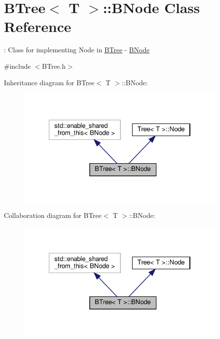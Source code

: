 \hypertarget{classBTree_1_1BNode}{}\section{B\+Tree$<$ T $>$\+:\+:B\+Node Class Reference}
\label{classBTree_1_1BNode}


\+: Class for implementing Node in \hyperlink{classBTree}{B\+Tree} -\/ \hyperlink{classBTree_1_1BNode}{B\+Node}  




{\ttfamily \#include $<$B\+Tree.\+h$>$}



Inheritance diagram for B\+Tree$<$ T $>$\+:\+:B\+Node\+:
\nopagebreak
\begin{figure}[H]
\begin{center}
\leavevmode
\includegraphics[width=298pt]{classBTree_1_1BNode__inherit__graph}
\end{center}
\end{figure}


Collaboration diagram for B\+Tree$<$ T $>$\+:\+:B\+Node\+:
\nopagebreak
\begin{figure}[H]
\begin{center}
\leavevmode
\includegraphics[width=298pt]{classBTree_1_1BNode__coll__graph}
\end{center}
\end{figure}
